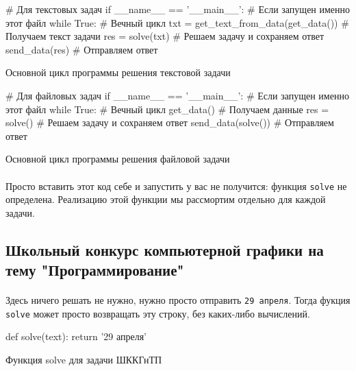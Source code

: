 \documentclass[12pt]{article}
\begin{document}
    \begin{listing}[H]
        \begin{pythoncode}
# Для текстовых задач
if __name__ == '__main__':                        # Если запущен именно этот файл
    while True:                                   # Вечный цикл
        txt = get_text_from_data(get_data())      # Получаем текст задачи
        res = solve(txt)                          # Решаем задачу и сохраняем ответ
        send_data(res)                            # Отправляем ответ
        \end{pythoncode}
        \caption{Основной цикл программы решения текстовой задачи}
        \label{lst:mainloop_text}
    \end{listing}

    \begin{listing}[H]
        \begin{pythoncode}
# Для файловых задач
if __name__ == '__main__':                        # Если запущен именно этот файл
    while True:                                   # Вечный цикл
        get_data()                                # Получаем данные
        res = solve()                             # Решаем задачу и сохраняем ответ
        send_data(solve())                        # Отправляем ответ
        \end{pythoncode}
        \caption{Основной цикл программы решения файловой задачи}
        \label{lst:mainloop_file}
    \end{listing}
    \paragraph{}
    Просто вставить этот код себе и запустить у вас не получится: функция \verb|solve| не определена.
    Реализацию этой функции мы рассмортим отдельно для каждой задачи.

    \subsection{Школьный конкурс компьютерной графики на тему "Программирование"}
    \paragraph{}
    Здесь ничего решать не нужно, нужно просто отправить \verb|29 апреля|.
    Тогда фукция \verb|solve| может просто возвращать эту строку, без каких-либо вычислений.
    \begin{listing}[H]
        \begin{pythoncode}
def solve(text):
    return '29 апреля'
        \end{pythoncode}
        \caption{Функция solve для задачи ШККГнТП}
        \label{lst:solve47}
    \end{listing}
\end{document}
